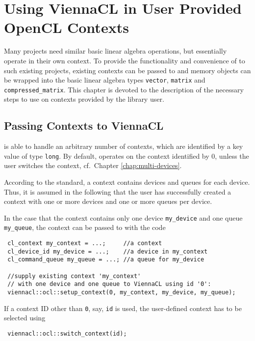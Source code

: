 \chapter{Using ViennaCL in User Provided OpenCL Contexts} \label{chap:custom-contexts}

Many projects need similar basic linear algebra operations, but essentially operate in their own {\OpenCL} context. 
To provide the functionality and convenience of {\ViennaCL} to such existing projects,
existing contexts can be passed to {\ViennaCL} and memory objects can be wrapped into the basic linear algebra types \lstinline|vector|, \lstinline|matrix| and \lstinline|compressed_matrix|.
This chapter is devoted to the description of the necessary steps to use {\ViennaCL} on contexts provided by the library user.


\section{Passing Contexts to ViennaCL}
{\ViennaCLversion} is able to handle an arbitrary number of contexts, which are identified by a key value of type \lstinline|long|. 
By default, {\ViennaCL} operates on the context identified by $0$, unless the user switches the context, cf.~Chapter \ref{chap:multi-devices}.

According to the {\OpenCL} standard, a context contains devices and queues for each device. Thus, it is assumed in the following that
the user has successfully created a context with one or more devices and one or more queues per device.

In the case that the context contains only one device \lstinline|my_device| and one queue \lstinline|my_queue|, the context can be passed to {\ViennaCL} with the code
\begin{lstlisting}
 cl_context my_context = ...;     //a context
 cl_device_id my_device = ...;    //a device in my_context
 cl_command_queue my_queue = ...; //a queue for my_device

 //supply existing context 'my_context'
 // with one device and one queue to ViennaCL using id '0':
 viennacl::ocl::setup_context(0, my_context, my_device, my_queue);
\end{lstlisting}
If a context ID other than \texttt{0}, say, \lstinline|id| is used, the user-defined context has to be selected using
\begin{lstlisting}
 viennacl::ocl::switch_context(id);
\end{lstlisting}


